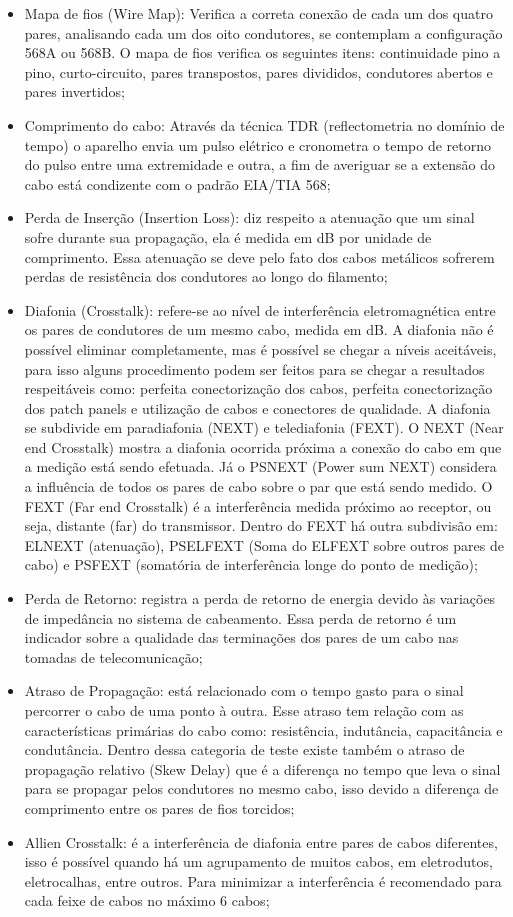 \documentclass[	DIV=calc,%
							paper=a4,%
							fontsize=12pt,%
							onecolumn]{scrartcl}	 					%
\begin{document}
\begin{itemize}
	\item Mapa de fios (Wire Map): Verifica a correta conexão de cada um dos quatro pares, analisando cada um dos oito condutores, se contemplam a configuração 568A ou	568B. O mapa de fios verifica os seguintes itens: continuidade pino a pino, curto-circuito, pares transpostos, pares divididos, condutores abertos e pares invertidos;
	\item Comprimento do cabo: Através da técnica TDR (reflectometria no domínio de tempo) o aparelho envia um pulso elétrico e cronometra o tempo de retorno do pulso entre uma extremidade e outra, a fim de averiguar se a extensão do cabo está condizente com o padrão EIA/TIA 568;
	\item Perda de Inserção (Insertion Loss): diz respeito a atenuação que um sinal sofre durante sua propagação, ela é medida em dB por unidade de comprimento. Essa atenuação se deve pelo fato dos cabos metálicos sofrerem perdas de resistência dos condutores ao longo do filamento;
	\item Diafonia (Crosstalk): refere-se ao nível de interferência eletromagnética entre os pares de condutores de um mesmo cabo, medida em dB. A diafonia não é possível eliminar completamente, mas é possível se chegar a níveis aceitáveis, para isso alguns procedimento podem ser feitos para se chegar a resultados respeitáveis como: perfeita conectorização dos cabos, perfeita conectorização dos patch panels e utilização de cabos e conectores de qualidade. A diafonia se subdivide em paradiafonia (NEXT) e telediafonia (FEXT). O NEXT (Near end Crosstalk) mostra a diafonia ocorrida próxima a conexão do cabo em que a medição está sendo efetuada. Já o PSNEXT (Power sum NEXT) considera a influência de todos os pares de cabo sobre o par que está sendo medido. O FEXT (Far end Crosstalk) é a interferência medida próximo ao
	receptor, ou seja, distante (far) do transmissor. Dentro do FEXT há outra subdivisão em: ELNEXT (atenuação), PSELFEXT (Soma do ELFEXT sobre outros pares de cabo) e PSFEXT (somatória de interferência longe do ponto de medição);
	\item Perda de Retorno: registra a perda de retorno de energia devido às variações de impedância no sistema de cabeamento. Essa perda de retorno é um indicador sobre a qualidade das terminações dos pares de um cabo nas tomadas de telecomunicação;
	\item Atraso de Propagação: está relacionado com o tempo gasto para o sinal percorrer o cabo de uma ponto à outra. Esse atraso tem relação com as características primárias do cabo como: resistência, indutância, capacitância e condutância. Dentro dessa categoria de teste existe também o atraso de propagação relativo (Skew Delay) que é a diferença no tempo que leva o sinal para se propagar pelos condutores no mesmo cabo, isso devido a diferença de comprimento entre os pares de fios torcidos;
	\item Allien Crosstalk: é a interferência de diafonia entre pares de cabos diferentes, isso é possível quando há um agrupamento de muitos cabos, em eletrodutos, eletrocalhas, entre outros. Para minimizar a interferência é recomendado para cada feixe de cabos no máximo 6 cabos;
\end{itemize}
\end{document}
